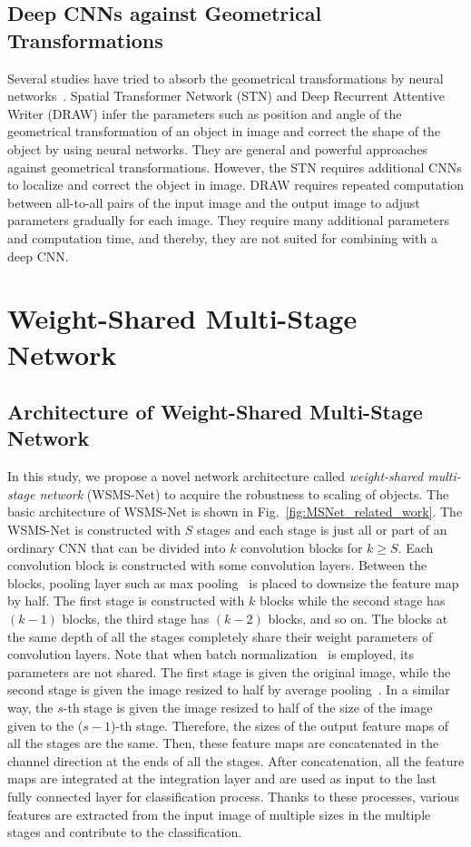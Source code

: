 \documentclass[journal]{IEEEtran}
\begin{document}
\subsection{Deep CNNs against Geometrical Transformations}
Several studies have tried to absorb the geometrical transformations by neural networks~\cite{Jaderberg2015,Gregor2015}.
Spatial Transformer Network (STN) and Deep Recurrent Attentive Writer (DRAW) infer the parameters such as position and angle of the geometrical transformation of an object in image and correct the shape of the object by using neural networks.
They are general and powerful approaches against geometrical transformations.
However, the STN requires additional CNNs to localize and correct the object in image.
DRAW requires repeated computation between all-to-all pairs of the input image and the output image to adjust parameters gradually for each image.
They require many additional parameters and computation time, and thereby, they are not suited for combining with a deep CNN.


\section{Weight-Shared Multi-Stage Network}
\subsection{Architecture of Weight-Shared Multi-Stage Network}
In this study, we propose a novel network architecture called \emph{weight-shared multi-stage network} (WSMS-Net) to acquire the robustness to scaling of objects.
The basic architecture of WSMS-Net is shown in Fig.~\ref{fig:MSNet_related_work}.
The WSMS-Net is constructed with $S$ stages and each stage is just all or part of an ordinary CNN that can be divided into $k$ convolution blocks for $k\ge S$.
Each convolution block is constructed with some convolution layers.
Between the blocks, pooling layer such as max pooling~\cite{Riesenhuber1999} is placed to downsize the feature map by half.
The first stage is constructed with $k$ blocks while the second stage has $(k-1)$ blocks, the third stage has $(k-2)$ blocks, and so on.
The blocks at the same depth of all the stages completely share their weight parameters of convolution layers.
Note that when batch normalization~\cite{Ioffe2015} is employed, its parameters are not shared.
The first stage is given the original image, while the second stage is given the image resized to half by average pooling~\cite{LeCun1989}.
In a similar way, the $s$-th stage is given the image resized to half of the size of the image given to the ($s\!-\!1$)-th stage.
Therefore, the sizes of the output feature maps of all the stages are the same.
Then, these feature maps are concatenated in the channel direction at the ends of all the stages.
After concatenation, all the feature maps are integrated at the integration layer and are used as input to the last fully connected layer for classification process.
Thanks to these processes, various features are extracted from the input image of multiple sizes in the multiple stages and contribute to the classification.
\end{document}
